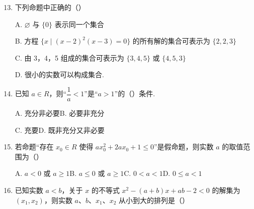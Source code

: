 \documentclass[a4paper,11pt]{article}
\begin{document}
\begin{enumerate}
\setcounter{enumi}{12}

\item 下列命题中正确的\mbox{（\quad）}

\keepwithprev
A. $\varnothing$ 与 $\{0\}$ 表示同一个集合

B. 方程 $\{x\mid(x-2)^2(x-3)=0\}$ 的所有解的集合可表示为 $\{2,2,3\}$

C. 由 3，4，5 组成的集合可表示为 $\{3,4,5\}$ 或 $\{4,5,3\}$

D. 很小的实数可以构成集合.

\ifanswer
\solbegin
{}
\solend
\fi

\item 已知 $a\in R$，则“$\dfrac1a<1$”是“$a>1$”的\mbox{（\quad）}条件.

\keepwithprev
A. 充分非必要\qquad B. 必要非充分

C. 充要\qquad D. 既非充分又非必要

\ifanswer
\solbegin
{}
\solend
\fi

\item 若命题“存在 $x_0\in R$ 使得 $ax_0^2+2ax_0+1\leqslant0$”是假命题，则实数 $a$ 的取值范围为\mbox{（\quad）}

\keepwithprev
A. $a<0$ 或 $a\geqslant1$\qquad B. $a\leqslant0$ 或 $a\geqslant1$\qquad C. $0<a<1$\qquad D. $0\leqslant a<1$

\ifanswer
\solbegin
{}
\solend
\fi

\item 已知实数 $a<b$，关于 $x$ 的不等式 $x^2-(a+b)x+ab-2<0$ 的解集为 $(x_1,x_2)$，则实数 $a$、$b$、$x_1$、$x_2$ 从小到大的排列是\mbox{（\quad）}


\end{enumerate}
\end{document}
